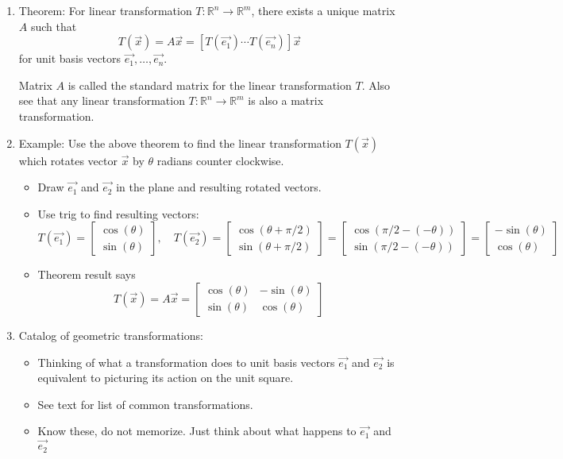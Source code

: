 \documentclass{article}
\begin{document}
\begin{enumerate}
\item Theorem: For linear transformation $T:\mathbb{R}^n \rightarrow \mathbb{R}^m$, there exists a unique matrix $A$ such that
\[
T(\vec{x}) = A\vec{x} = \left[ T(\vec{e_1}) \cdots T(\vec{e_n}) \right]\vec{x}
\]
for unit basis vectors $\vec{e_1}, \dots, \vec{e_n}$.

Matrix $A$ is called the standard matrix for the linear transformation $T$. Also see that any linear transformation $T:\mathbb{R}^n \rightarrow \mathbb{R}^m$ is also a matrix transformation.

\item Example: Use the above theorem to find the linear transformation $T(\vec{x})$ which rotates vector $\vec{x}$ by $\theta$ radians counter clockwise.
\begin{itemize}
\item Draw $\vec{e_1}$ and $\vec{e_2}$ in the plane and resulting rotated vectors.
\item Use trig to find resulting vectors:
\[
T(\vec{e_1}) = \left[ \begin{array}{c}
\cos(\theta) \\
\sin(\theta)
\end{array} \right]
, \quad 
T(\vec{e_2}) = \left[ \begin{array}{c}
\cos(\theta+\pi/2) \\
\sin(\theta+\pi/2)
\end{array} \right]
= \left[ \begin{array}{c}
\cos(\pi/2-(-\theta)) \\
\sin(\pi/2-(-\theta))
\end{array} \right]
= \left[ \begin{array}{c}
-\sin(\theta) \\
\cos(\theta)
\end{array} \right]
\]
\item Theorem result says
\[
T(\vec{x}) = A\vec{x} = 
\left[
\begin{array}{cc}
\cos(\theta) & -\sin(\theta) \\
\sin(\theta) & \cos(\theta)
\end{array}
\right]
\]
\end{itemize}

\item Catalog of geometric transformations:
\begin{itemize}
\item Thinking of what a transformation does to unit basis vectors $\vec{e_1}$ and $\vec{e_2}$ is equivalent to picturing its action on the unit square. 
\item See text for list of common transformations.
\item Know these, do not memorize. Just think about what happens to $\vec{e_1}$ and $\vec{e_2}$
\end{itemize}



\end{enumerate}
\end{document}
